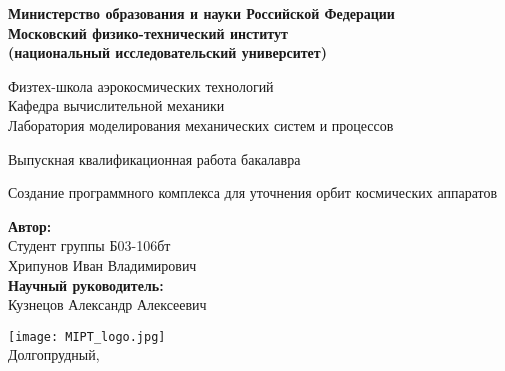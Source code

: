 \begin{center}
    \large\textbf{Министерство образования и науки Российской Федерации \\
    Московский физико-технический институт \\
    (национальный исследовательский университет)} \\
    \vspace{1cm}

    Физтех-школа аэрокосмических технологий \\

    Кафедра вычислительной механики \\
    Лаборатория моделирования механических систем и процессов\\

    \vspace{3em}

    Выпускная квалификационная работа бакалавра
\end{center}

\begin{center}
    \vspace{\fill}
    \LARGE{Создание программного комплекса для уточнения орбит космических аппаратов}

    \vspace{\fill}
\end{center}


\begin{flushright}
    \textbf{Автор:} \\
    Студент группы Б03-106бт \\
    Хрипунов Иван Владимирович \\
    \vspace{2em}
    \textbf{Научный руководитель:} \\
    Кузнецов Александр Алексеевич \\
    \vspace{2em}
\end{flushright}

\vspace{7em}

\begin{center}
    \texttt{[image: MIPT\_logo.jpg]}\\
    Долгопрудный, \the\year{}
\end{center}

\thispagestyle{empty}

\newpage
\setcounter{page}{2}
